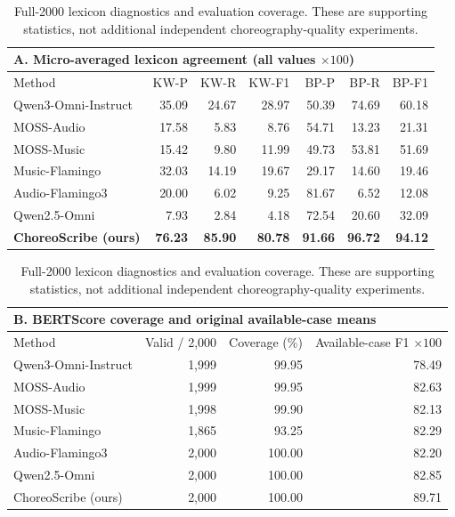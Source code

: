 \begin{table}[!htbp]
\centering
\caption{Full-2000 lexicon diagnostics and evaluation coverage. These are supporting statistics, not additional independent choreography-quality experiments.}
\label{tab:e2-full2000-diagnostics}
\begingroup\small
\setlength{\tabcolsep}{3pt}\renewcommand{\arraystretch}{1.12}
\begin{tabular*}{\textwidth}{@{\extracolsep{\fill}}lrrrrrr@{}}
\toprule
\multicolumn{7}{l}{\textbf{A. Micro-averaged lexicon agreement (all values $\times 100$)}}\\
\midrule
Method & KW-P & KW-R & KW-F1 & BP-P & BP-R & BP-F1 \\
\midrule
Qwen3-Omni-Instruct & 35.09 & 24.67 & 28.97 & 50.39 & 74.69 & 60.18 \\
MOSS-Audio & 17.58 & 5.83 & 8.76 & 54.71 & 13.23 & 21.31 \\
MOSS-Music & 15.42 & 9.80 & 11.99 & 49.73 & 53.81 & 51.69 \\
Music-Flamingo & 32.03 & 14.19 & 19.67 & 29.17 & 14.60 & 19.46 \\
Audio-Flamingo3 & 20.00 & 6.02 & 9.25 & 81.67 & 6.52 & 12.08 \\
Qwen2.5-Omni & 7.93 & 2.84 & 4.18 & 72.54 & 20.60 & 32.09 \\
\textbf{ChoreoScribe (ours)} & \textbf{76.23} & \textbf{85.90} & \textbf{80.78} & \textbf{91.66} & \textbf{96.72} & \textbf{94.12} \\
\bottomrule\end{tabular*}\par\vspace{9pt}
\begin{tabular*}{\textwidth}{@{\extracolsep{\fill}}lrrr@{}}
\toprule
\multicolumn{4}{l}{\textbf{B. BERTScore coverage and original available-case means}}\\
\midrule
Method & Valid / 2,000 & Coverage (\%) & Available-case F1 $\times100$ \\
\midrule
Qwen3-Omni-Instruct & 1,999 & 99.95 & 78.49 \\
MOSS-Audio & 1,999 & 99.95 & 82.63 \\
MOSS-Music & 1,998 & 99.90 & 82.13 \\
Music-Flamingo & 1,865 & 93.25 & 82.29 \\
Audio-Flamingo3 & 2,000 & 100.00 & 82.20 \\
Qwen2.5-Omni & 2,000 & 100.00 & 82.85 \\
ChoreoScribe (ours) & 2,000 & 100.00 & 89.71 \\

\end{tabular*}
\end{table}
